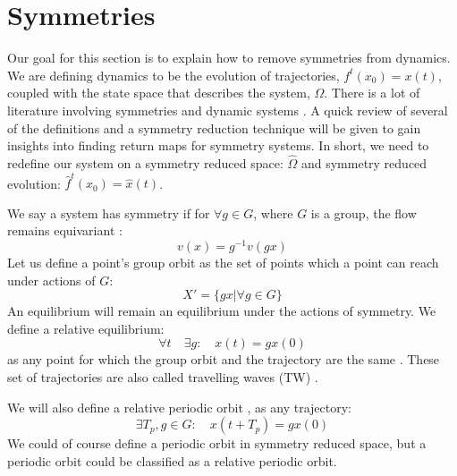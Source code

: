 \documentclass[aip,cha,reprint,
secnumarabic,
nofootinbib, tightenlines,
nobibnotes, showkeys, showpacs,
groupedaddress
]{revtex4-1}
\begin{document}
\section{Symmetries}
\label{sec:Symm}
Our goal for this section is to explain how to remove symmetries from dynamics.  We are defining dynamics to be the evolution of trajectories, $f^{t}(x_0) = x(t)$, coupled with the state space that describes the system, $\Omega$.  There is a lot of literature involving symmetries and dynamic systems \cite{CB, Eth, SliceCond, SRetMap, Atl}.  A quick review of several of the definitions and a symmetry reduction technique will be given to gain insights into finding return maps for symmetry systems.  In short, we need to redefine our system on a symmetry reduced space: $\hat{\Omega}$ and symmetry reduced evolution: $\hat{f}^{t}(x_0) = \hat{x}(t)$.

We say a system has symmetry if for $\forall g\in G$, where $G$ is a group, the flow remains equivariant \cite{CB}:
\begin{equation}
v(x) = g^{-1}v(gx)
\label{eq:SymmEqui}
\end{equation}
Let us define a point's group orbit \cite{CB} as the set of points which a point can reach under actions of $G$:
\begin{equation}
X' = \{gx | \forall g \in G\}
\end{equation}
An equilibrium will remain an equilibrium under the actions of symmetry.  We define a relative equilibrium:
\begin{equation}
\forall t \quad \exists{g}: \quad x(t) = gx(0)
\end{equation}
as any point for which the group orbit and the trajectory are the same \cite{CB}.  These set of trajectories are also called travelling waves (TW) \cite{CB}.

We will also define a relative periodic orbit \cite{CB}, as any trajectory:
\begin{equation}
\exists{T_p}, g\in G: \quad  x(t+T_p) = gx(0)
\end{equation}
We could of course define a periodic orbit in symmetry reduced space, but a periodic orbit could be classified as a relative periodic orbit.
\end{document}
